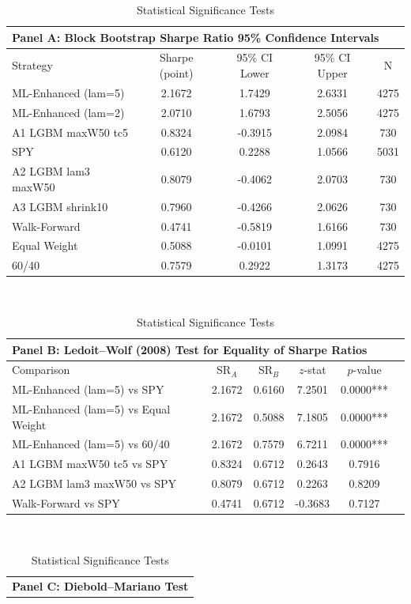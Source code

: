 \begin{table}[htbp]
\centering
\caption{Statistical Significance Tests}
\label{tab:significance}
\small
\begin{tabular}{lcccc}
\toprule
\multicolumn{5}{l}{\textbf{Panel A: Block Bootstrap Sharpe Ratio 95\% Confidence Intervals}} \\
\midrule
Strategy & Sharpe (point) & 95\% CI Lower & 95\% CI Upper & N \\
\midrule
ML-Enhanced (lam=5) & 2.1672 & 1.7429 & 2.6331 & 4275 \\
ML-Enhanced (lam=2) & 2.0710 & 1.6793 & 2.5056 & 4275 \\
A1 LGBM maxW50 tc5 & 0.8324 & -0.3915 & 2.0984 & 730 \\
SPY & 0.6120 & 0.2288 & 1.0566 & 5031 \\
A2 LGBM lam3 maxW50 & 0.8079 & -0.4062 & 2.0703 & 730 \\
A3 LGBM shrink10 & 0.7960 & -0.4266 & 2.0626 & 730 \\
Walk-Forward & 0.4741 & -0.5819 & 1.6166 & 730 \\
Equal Weight & 0.5088 & -0.0101 & 1.0991 & 4275 \\
60/40 & 0.7579 & 0.2922 & 1.3173 & 4275 \\
\bottomrule
\end{tabular}
\\[12pt]
\begin{tabular}{lccccc}
\toprule
\multicolumn{6}{l}{\textbf{Panel B: Ledoit--Wolf (2008) Test for Equality of Sharpe Ratios}} \\
\midrule
Comparison & SR$_A$ & SR$_B$ & $z$-stat & $p$-value & \\
\midrule
ML-Enhanced (lam=5) vs SPY & 2.1672 & 0.6160 & 7.2501 & 0.0000*** \\
ML-Enhanced (lam=5) vs Equal Weight & 2.1672 & 0.5088 & 7.1805 & 0.0000*** \\
ML-Enhanced (lam=5) vs 60/40 & 2.1672 & 0.7579 & 6.7211 & 0.0000*** \\
A1 LGBM maxW50 tc5 vs SPY & 0.8324 & 0.6712 & 0.2643 & 0.7916 \\
A2 LGBM lam3 maxW50 vs SPY & 0.8079 & 0.6712 & 0.2263 & 0.8209 \\
Walk-Forward vs SPY & 0.4741 & 0.6712 & -0.3683 & 0.7127 \\
\bottomrule
\end{tabular}
\\[12pt]
\begin{tabular}{lccc}
\toprule
\multicolumn{4}{l}{\textbf{Panel C: Diebold--Mariano Test}} \\

\end{tabular}
\end{table}
